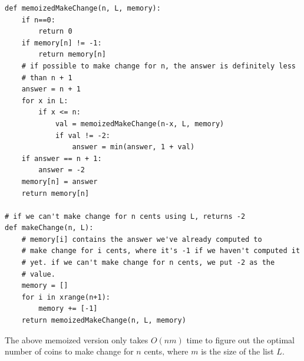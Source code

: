 \documentclass[11pt]{article}
\begin{document}
\begin{verbatim}
def memoizedMakeChange(n, L, memory):
    if n==0:
        return 0
    if memory[n] != -1:
        return memory[n]
    # if possible to make change for n, the answer is definitely less
    # than n + 1
    answer = n + 1
    for x in L:
        if x <= n:
            val = memoizedMakeChange(n-x, L, memory)
            if val != -2:
                answer = min(answer, 1 + val)
    if answer == n + 1:
        answer = -2
    memory[n] = answer
    return memory[n]

# if we can't make change for n cents using L, returns -2
def makeChange(n, L):
    # memory[i] contains the answer we've already computed to
    # make change for i cents, where it's -1 if we haven't computed it
    # yet. if we can't make change for n cents, we put -2 as the
    # value.
    memory = []
    for i in xrange(n+1):
        memory += [-1]    
    return memoizedMakeChange(n, L, memory)
\end{verbatim}

The above memoized version only takes $O(nm)$ time to figure out the
optimal number of coins to make change for $n$ cents, where $m$ is the
size of the list $L$.
\end{document}
